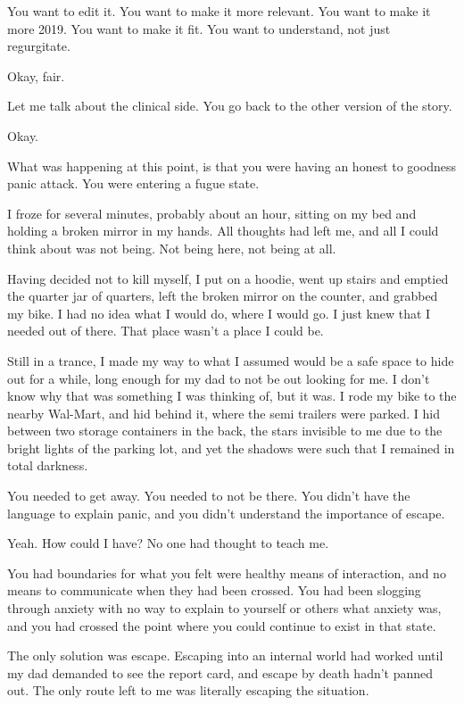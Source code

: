 \begin{paracol}{2}
\begin{leftcolumn}
\begin{ally}
You want to edit it. You want to make it more relevant. You want to make it more 2019. You want to make it fit. You want to understand, not just regurgitate.
\end{ally}
Okay, fair.

\begin{ally}
Let me talk about the clinical side. You go back to the other version of the story.
\end{ally}
Okay.

\begin{ally}
What was happening at this point, is that you were having an honest to goodness panic attack. You were entering a fugue state.
\end{ally}
I froze for several minutes, probably about an hour, sitting on my bed and holding a broken mirror in my hands. All thoughts had left me, and all I could think about was not being. Not being here, not being at all.

Having decided not to kill myself, I put on a hoodie, went up stairs and emptied the quarter jar of quarters, left the broken mirror on the counter, and grabbed my bike. I had no idea what I would do, where I would go. I just knew that I needed out of there. That place wasn't a place I could be.

Still in a trance, I made my way to what I assumed would be a safe space to hide out for a while, long enough for my dad to not be out looking for me. I don't know why that was something I was thinking of, but it was. I rode my bike to the nearby Wal-Mart, and hid behind it, where the semi trailers were parked. I hid between two storage containers in the back, the stars invisible to me due to the bright lights of the parking lot, and yet the shadows were such that I remained in total darkness.

\begin{ally}
You needed to get away. You needed to not be there. You didn't have the language to explain panic, and you didn't understand the importance of escape.
\end{ally}
Yeah. How could I have? No one had thought to teach me.

\begin{ally}
You had boundaries for what you felt were healthy means of interaction, and no means to communicate when they had been crossed. You had been slogging through anxiety with no way to explain to yourself or others what anxiety was, and you had crossed the point where you could continue to exist in that state.
\end{ally}
The only solution was escape. Escaping into an internal world had worked until my dad demanded to see the report card, and escape by death hadn't panned out. The only route left to me was literally escaping the situation.


\end{leftcolumn}
\end{paracol}
